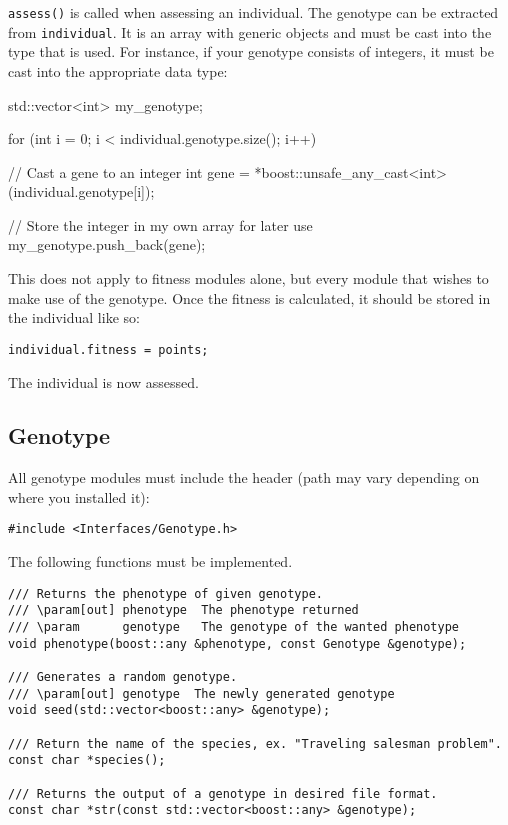 \noindent \texttt{assess()} is called when assessing an individual. The genotype can be extracted from \texttt{individual}. It is an array with generic objects and must be cast into the type that is used. For instance, if your genotype consists of integers, it must be cast into the appropriate data type:

\begin{verbatimtab}
std::vector<int> my_genotype;

for (int i = 0; i < individual.genotype.size(); i++)
{
	// Cast a gene to an integer
	int gene = *boost::unsafe_any_cast<int>(individual.genotype[i]);

	// Store the integer in my own array for later use
	my_genotype.push_back(gene);
}
\end{verbatimtab}

\noindent This does not apply to fitness modules alone, but every module that wishes to make use of the genotype. Once the fitness is calculated, it should be stored in the individual like so:

\begin{verbatim}
individual.fitness = points;
\end{verbatim}

\noindent The individual is now assessed.


\subsection{Genotype}

All genotype modules must include the header (path may vary depending on where you installed it):

\begin{verbatim}
#include <Interfaces/Genotype.h>
\end{verbatim}

\noindent The following functions must be implemented.

\begin{verbatim}
/// Returns the phenotype of given genotype.
/// \param[out]	phenotype  The phenotype returned
/// \param		genotype   The genotype of the wanted phenotype
void phenotype(boost::any &phenotype, const Genotype &genotype);

/// Generates a random genotype.
/// \param[out] genotype  The newly generated genotype
void seed(std::vector<boost::any> &genotype);

/// Return the name of the species, ex. "Traveling salesman problem".
const char *species();

/// Returns the output of a genotype in desired file format.
const char *str(const std::vector<boost::any> &genotype);
\end{verbatim}

